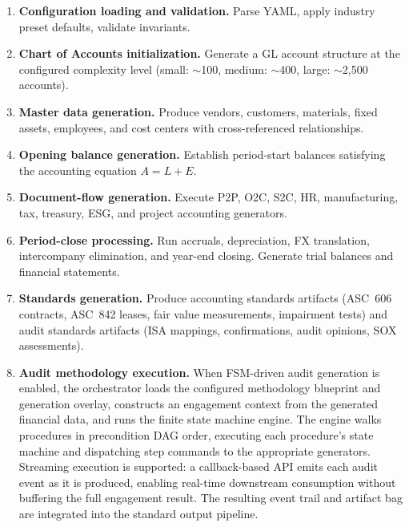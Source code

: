 \begin{enumerate}
  \item \textbf{Configuration loading and validation.}  Parse YAML,
    apply industry preset defaults, validate invariants.

  \item \textbf{Chart of Accounts initialization.}  Generate a GL
    account structure at the configured complexity level (small:
    $\sim$100, medium: $\sim$400, large: $\sim$2{,}500 accounts).

  \item \textbf{Master data generation.}  Produce vendors, customers,
    materials, fixed assets, employees, and cost centers with
    cross-referenced relationships.

  \item \textbf{Opening balance generation.}  Establish period-start
    balances satisfying the accounting equation $A = L + E$.

  \item \textbf{Document-flow generation.}  Execute P2P, O2C, S2C, HR,
    manufacturing, tax, treasury, ESG, and project accounting generators.

  \item \textbf{Period-close processing.}  Run accruals, depreciation,
    FX translation, intercompany elimination, and year-end closing.
    Generate trial balances and financial statements.

  \item \textbf{Standards generation.}  Produce accounting standards
    artifacts (ASC~606 contracts, ASC~842 leases, fair value measurements,
    impairment tests) and audit standards artifacts (ISA mappings,
    confirmations, audit opinions, SOX assessments).

  \item \textbf{Audit methodology execution.}  When FSM-driven audit
    generation is enabled, the orchestrator loads the configured
    methodology blueprint and generation overlay, constructs an
    engagement context from the generated financial data, and runs the
    finite state machine engine.  The engine walks procedures in
    precondition DAG order, executing each procedure's state machine and
    dispatching step commands to the appropriate generators.  Streaming
    execution is supported: a callback-based API emits each audit event
    as it is produced, enabling real-time downstream consumption without
    buffering the full engagement result.  The resulting event trail and
    artifact bag are integrated into the standard output pipeline.


\end{enumerate}
